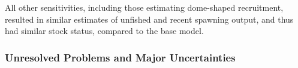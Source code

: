 \documentclass[11pt,
  english,
  a4paper,
]{article}
\begin{document}
\leavevmode\tagmcend\tagstructend\par


All other sensitivities, including those estimating dome-shaped recruitment, resulted in similar estimates of unfished and recent spawning output, and thus had similar stock status, compared to the base model.

\leavevmode\tagmcend\tagstructend\par


\hypertarget{unresolved-problems-and-major-uncertainties}{%
\subsubsection{Unresolved Problems and Major Uncertainties}\label{unresolved-problems-and-major-uncertainties}}

\leavevmode\tagmcend\tagstructend

\end{document}
